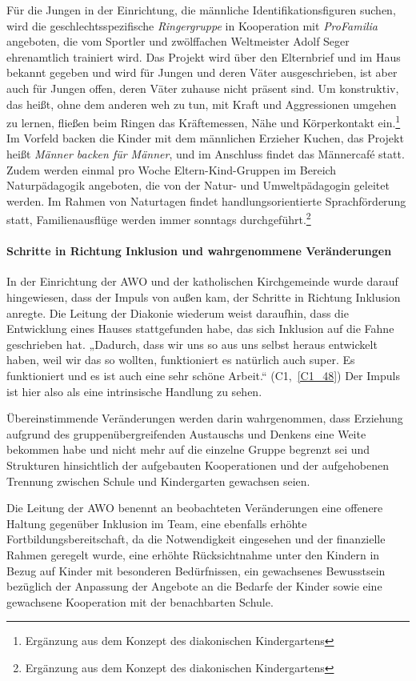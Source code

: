 Für die Jungen in der Einrichtung, die männliche Identifikationsfiguren suchen, wird die geschlechtsspezifische \emph{Ringergruppe} in Kooperation mit \emph{ProFamilia} angeboten, die vom Sportler und zwölffachen Weltmeister Adolf Seger ehrenamtlich trainiert wird. Das Projekt wird über den Elternbrief und im Haus bekannt gegeben und wird für Jungen und deren Väter ausgeschrieben, ist aber auch für Jungen offen, deren Väter zuhause nicht präsent sind. Um konstruktiv, das heißt, ohne dem anderen weh zu tun, mit Kraft und Aggressionen umgehen zu lernen, fließen beim Ringen das Kräftemessen, Nähe und Körperkontakt ein.\footnote{Ergänzung aus dem Konzept des diakonischen Kindergartens} Im Vorfeld backen die Kinder mit dem männlichen Erzieher Kuchen, das Projekt heißt \emph{Männer backen für Männer}, und im Anschluss findet das Männercafé statt.
Zudem werden einmal pro Woche Eltern-Kind-Gruppen im Bereich Naturpädagogik angeboten, die von der Natur- und Umweltpädagogin geleitet werden. Im Rahmen von Naturtagen findet handlungsorientierte Sprachförderung statt, Familienausflüge werden immer sonntags durchgeführt.\footnote{Ergänzung aus dem Konzept des diakonischen Kindergartens}

\paragraph{Schritte in Richtung Inklusion und wahrgenommene Veränderungen}

In der Einrichtung der AWO und der katholischen Kirchgemeinde wurde darauf hingewiesen, dass der Impuls von außen kam, der Schritte in Richtung Inklusion anregte. Die Leitung der Diakonie wiederum weist daraufhin, dass die Entwicklung eines Hauses stattgefunden habe, das sich Inklusion auf die Fahne geschrieben hat. „Dadurch, dass wir uns so aus uns selbst heraus entwickelt haben, weil wir das so wollten, funktioniert es natürlich auch super. Es funktioniert und es ist auch eine sehr schöne Arbeit.“ (C1,~\ref{C1_48}) Der Impuls ist hier also als eine intrinsische Handlung zu sehen.

Übereinstimmende Veränderungen werden darin wahrgenommen, dass Erziehung aufgrund des gruppenübergreifenden Austauschs und Denkens  eine Weite bekommen habe und nicht mehr auf die einzelne Gruppe begrenzt sei und Strukturen hinsichtlich der aufgebauten Kooperationen und der aufgehobenen Trennung zwischen Schule und Kindergarten gewachsen seien.  

Die Leitung der AWO benennt an beobachteten Veränderungen eine offenere Haltung gegenüber Inklusion im Team, eine ebenfalls erhöhte Fortbildungsbereitschaft, da die Notwendigkeit eingesehen und der finanzielle Rahmen geregelt wurde, eine erhöhte Rücksichtnahme unter den Kindern in Bezug auf Kinder mit besonderen Bedürfnissen, ein gewachsenes Bewusstsein bezüglich der Anpassung der Angebote an die  Bedarfe der Kinder sowie eine gewachsene Kooperation mit der benachbarten Schule.

